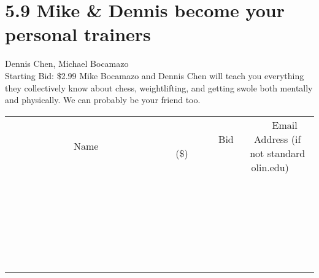 \documentclass[11pt]{article}
\begin{document}
\section*{5.9 Mike \& Dennis become your personal trainers}
Dennis Chen, Michael Bocamazo
\\
Starting Bid: \$2.99
\newline
Mike Bocamazo and Dennis Chen will teach you everything they collectively know about chess, weightlifting, and getting swole both mentally and physically. We can probably be your friend too.
\\[6ex]
\begin{tabular}{c c c}
~~~~~~~~~~~~~Name~~~~~~~~~~~~~ & ~~~~~~~~~Bid (\$)~~~~~~~~~  & ~~~Email Address (if not standard olin.edu)~~~\\
 & & \\
\hline
 & & \\
\hline
 & & \\
\hline
 & & \\
\hline
 & & \\
\hline
 & & \\
\hline
 & & \\
\hline
 & & \\
\hline
 & & \\
\hline
 & & \\
\hline
 & & \\
\hline
 & & \\
\hline
 & & \\
\hline
 & & \\
\hline
 & & \\
\hline
 & & \\
\hline
 & & \\
\hline
 & & \\
\hline
 & & \\
\hline
 & & \\
\hline
 & & \\
\hline
 & & \\
\hline
 & & \\
\hline
 & & \\
\hline
 & & \\
\hline
 & & \\
\hline
\end{tabular}
\newpage
\end{document}
